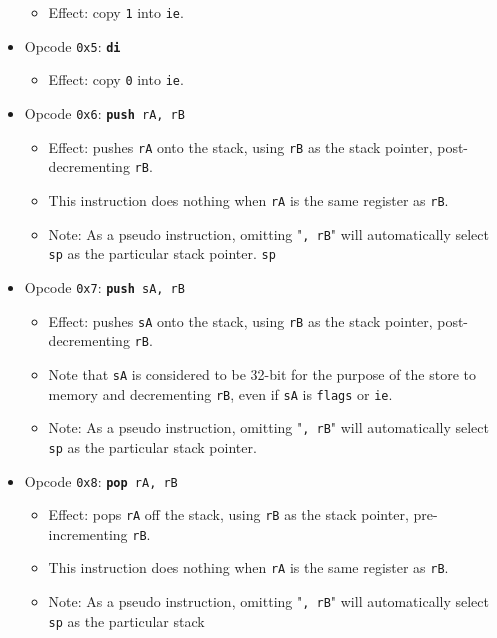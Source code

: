 \documentclass{article}
\begin{document}
\begin{itemize}
\begin{itemize}
		\item Effect: copy \texttt{1} into \texttt{ie}.
		\end{itemize}
	\item Opcode \texttt{0x5}:
		\texttt{\textbf{di}}
		\begin{itemize}
		\item Effect: copy \texttt{0} into \texttt{ie}.
		\end{itemize}
	\item Opcode \texttt{0x6}:
		\texttt{\textbf{push} rA, rB}
		\begin{itemize}
		\item Effect: pushes \texttt{rA} onto the stack, using
		\texttt{rB} as the stack pointer, post-decrementing
		\texttt{rB}.
		\item This instruction does nothing when \texttt{rA} is the
		same register as \texttt{rB}. 
		\item Note: As a pseudo instruction, omitting "\texttt{, rB}" will
			automatically select \texttt{sp} as the particular stack
			pointer. 
		\texttt{sp}
		\end{itemize}
	\item Opcode \texttt{0x7}:
		\texttt{\textbf{push} sA, rB}
		\begin{itemize}
		\item Effect: pushes \texttt{sA} onto the stack, using
		\texttt{rB} as the stack pointer, post-decrementing
		\texttt{rB}.
		\item Note that \texttt{sA} is considered to be 32-bit for the
		purpose of the store to memory and decrementing \texttt{rB},
		even if \texttt{sA} is \texttt{flags} or \texttt{ie}.
		\item Note: As a pseudo instruction, omitting "\texttt{, rB}" will
			automatically select \texttt{sp} as the particular stack
			pointer. 
		\end{itemize}
	\item Opcode \texttt{0x8}:
		\texttt{\textbf{pop} rA, rB}
		\begin{itemize}
		\item Effect: pops \texttt{rA} off the stack, using
		\texttt{rB} as the stack pointer, pre-incrementing \texttt{rB}.
		\item This instruction does nothing when \texttt{rA} is the
		same register as \texttt{rB}. 
		\item Note: As a pseudo instruction, omitting "\texttt{, rB}" will
			automatically select \texttt{sp} as the particular stack

\end{itemize}
\end{itemize}
\end{document}
